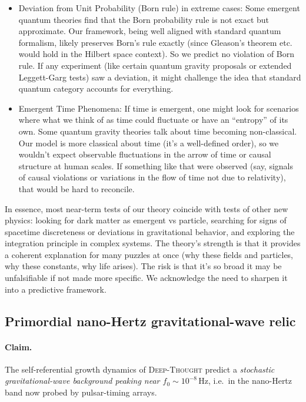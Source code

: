 \documentclass{article}
\begin{document}
\begin{itemize}
\item Deviation from Unit Probability (Born rule) in extreme cases: Some emergent quantum theories find that the Born probability rule is not exact but approximate. Our framework, being well aligned with standard quantum formalism, likely preserves Born’s rule exactly (since Gleason’s theorem etc. would hold in the Hilbert space context). So we predict no violation of Born rule. If any experiment (like certain quantum gravity proposals or extended Leggett-Garg tests) saw a deviation, it might challenge the idea that standard quantum category accounts for everything.
\item Emergent Time Phenomena: If time is emergent, one might look for scenarios where what we think of as time could fluctuate or have an “entropy” of its own. Some quantum gravity theories talk about time becoming non-classical. Our model is more classical about time (it’s a well-defined order), so we wouldn’t expect observable fluctuations in the arrow of time or causal structure at human scales. If something like that were observed (say, signals of causal violations or variations in the flow of time not due to relativity), that would be hard to reconcile.
\end{itemize}

In essence, most near-term tests of our theory coincide with tests of other new physics: looking for dark matter as emergent vs particle, searching for signs of spacetime discreteness or deviations in gravitational behavior, and exploring the integration principle in complex systems. The theory’s strength is that it provides a coherent explanation for many puzzles at once (why these fields and particles, why these constants, why life arises). The risk is that it’s so broad it may be unfalsifiable if not made more specific. We acknowledge the need to sharpen it into a predictive framework.

\subsection{Primordial nano-Hertz gravitational-wave relic}
\label{subsec:nHz_GW}

\paragraph{Claim.}
The self-referential growth dynamics of \textsc{Deep-Thought} predict a
\emph{stochastic gravitational-wave background peaking near
\(f_{0}\!\sim\!10^{-8}\,\mathrm{Hz}\)}, i.e.\ in the nano-Hertz band now
probed by pulsar-timing arrays.
\end{document}
